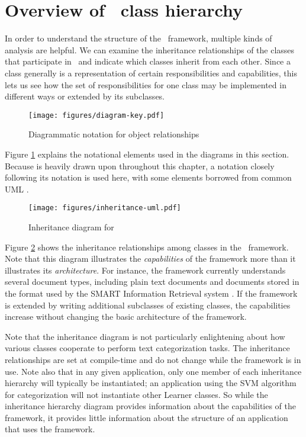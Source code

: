 \section{Overview of \aicat\ class hierarchy}
\label{class-overview}

In order to understand the structure of the \aicat\ framework,
multiple kinds of analysis are helpful.  We can examine the
inheritance relationships of the classes that participate in
\aicat\, and indicate which classes inherit from each other.
Since a class generally is a representation of certain
responsibilities and capabilities, this lets us see how the set of
responsibilities for one class may be implemented in different ways or
extended by its subclasses.

\begin{figure}
\begin{center}
\texttt{[image: figures/diagram-key.pdf]}
\caption{Diagrammatic notation for object relationships}
\label{diagram-key}
\end{center}
\end{figure}

Figure \ref{diagram-key} explains the notational elements used in the
diagrams in this section.  Because \cite{gamma:95} is heavily drawn
upon throughout this chapter, a notation closely following its
notation is used here, with some elements borrowed from common UML
\cite[ch. 4-5]{booch:98}.

\begin{figure}
\texttt{[image: figures/inheritance-uml.pdf]}
\caption{Inheritance diagram for \aicat}
\label{inheritance-uml}
\end{figure}

Figure \ref{inheritance-uml} shows the inheritance relationships among
classes in the \aicat\ framework.  Note that this diagram
illustrates the \emph{capabilities} of the framework more than it
illustrates its \emph{architecture}.  For instance, the framework
currently understands several document types, including plain text
documents and documents stored in the format used by the SMART
Information Retrieval system \cite{buckley:94}.  If the framework is
extended by writing additional subclasses of existing classes, the
capabilities increase without changing the basic architecture of the
framework.

Note that the inheritance diagram is not particularly enlightening
about how various classes cooperate to perform text categorization
tasks.  The inheritance relationships are set at compile-time and do
not change while the framework is in use.  Note also that in any given
application, only one member of each inheritance hierarchy will
typically be instantiated; an application using the SVM algorithm for
categorization will not instantiate other Learner classes.  So while
the inheritance hierarchy diagram provides information about the
capabilities of the framework, it provides little information about
the structure of an application that uses the framework.

